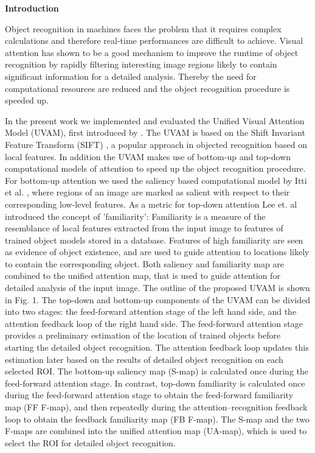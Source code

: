 \begin{center} \textbf{\Large Introduction} \end{center}
\doublespacing
Object recognition in machines faces the problem that it requires complex calculations and therefore real-time performances are difficult to achieve. Visual attention has shown to be a good mechanism to improve the runtime of object recognition by rapidly filtering interesting image regions likely to contain significant information for a detailed analysis. Thereby the need for computational resources are reduced and the object recognition procedure is speeded up.\par
In the present work we implemented and evaluated the Unified Visual Attention Model (UVAM), first introduced by \cite{lee2010}. The UVAM is based on the Shift Invariant Feature Transform (SIFT) \cite{lowe2004}, a popular approach in objected recognition based on local features. In addition the UVAM makes use of bottom-up and top-down computational models of attention to speed up the object recognition procedure. For bottom-up attention we used the saliency based computational model by Itti et al. \cite{itti1998}, where regions of an image are marked as salient with respect to their corresponding low-level features. As a metric for top-down attention Lee et. al \cite{lee2010} introduced the concept of 'familiarity': Familiarity is a measure of the resemblance of local features extracted from the input image to features of trained object models stored in a database. Features of high familiarity are seen as evidence of object existence, and are used to guide attention to locations likely to contain the corresponding object. Both saliency and familiarity map are combined to the unified attention map, that is used to guide attention for detailed analysis of the input image. The outline of the proposed UVAM is shown in Fig. 1. The top-down and bottom-up components of the UVAM can be divided into two stages: the feed-forward attention stage of the left hand side, and the attention feedback loop of the right hand side. The feed-forward
attention stage provides a preliminary estimation of the location of trained objects before starting the detailed object recognition. The attention feedback loop updates this estimation later based on the results of detailed object recognition on each selected ROI. The bottom-up saliency map (S-map) is calculated once during the feed-forward attention stage. In contrast, top-down familiarity is calculated once during the feed-forward attention stage to obtain the feed-forward familiarity map (FF F-map), and then repeatedly during the attention–recognition feedback loop to obtain the feedback familiarity map (FB F-map). The S-map and the two F-maps are combined into the unified attention map (UA-map), which is used to select the ROI for detailed object recognition.\\
